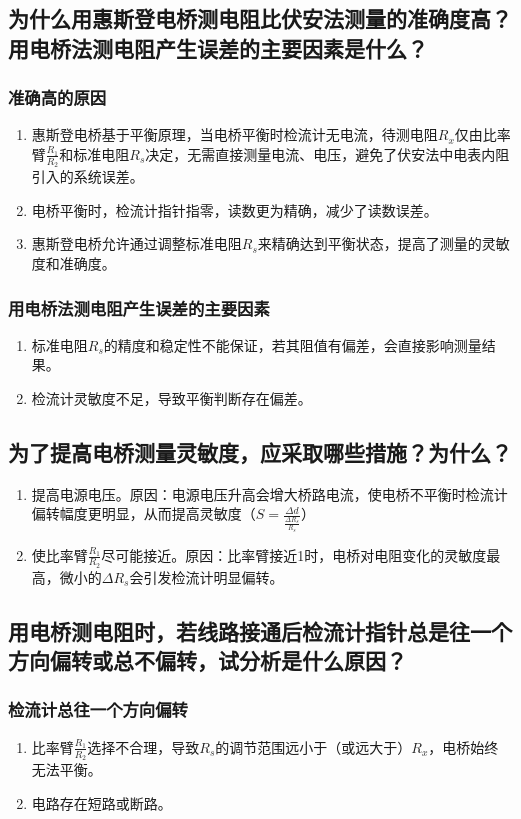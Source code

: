 \documentclass[]{../template/Report}%
\begin{document}
\begin{fullreportonly}
\subsection{为什么用惠斯登电桥测电阻比伏安法测量的准确度高？用电桥法测电阻产生误差的主要因素是什么？}

\subsubsection{准确高的原因}
\begin{enumerate}
   \item 惠斯登电桥基于平衡原理，当电桥平衡时检流计无电流，待测电阻\(R_x\)仅由比率臂\(\frac{R_1}{R_2}\)和标准电阻\(R_s\)决定，无需直接测量电流、电压，避免了伏安法中电表内阻引入的系统误差。
   \item 电桥平衡时，检流计指针指零，读数更为精确，减少了读数误差。
   \item 惠斯登电桥允许通过调整标准电阻\(R_s\)来精确达到平衡状态，提高了测量的灵敏度和准确度。
\end{enumerate}
\subsubsection{用电桥法测电阻产生误差的主要因素}
\begin{enumerate}
   \item 标准电阻\(R_s\)的精度和稳定性不能保证，若其阻值有偏差，会直接影响测量结果。
   \item 检流计灵敏度不足，导致平衡判断存在偏差。
\end{enumerate}
\subsection{为了提高电桥测量灵敏度，应采取哪些措施？为什么？}
\begin{enumerate}
  \item 提高电源电压。原因：电源电压升高会增大桥路电流，使电桥不平衡时检流计偏转幅度更明显，从而提高灵敏度（\(S = \frac{\Delta d}{\frac{\Delta R_s}{R_s}}\)）
  \item 使比率臂\(\frac{R_1}{R_2}\)尽可能接近。原因：比率臂接近1时，电桥对电阻变化的灵敏度最高，微小的\(\Delta R_s\)会引发检流计明显偏转。
\end{enumerate}
\subsection{用电桥测电阻时，若线路接通后检流计指针总是往一个方向偏转或总不偏转，试分析是什么原因？}
\subsubsection{检流计总往一个方向偏转}
\begin{enumerate}
   \item 比率臂\(\frac{R_1}{R_2}\)选择不合理，导致\(R_s\)的调节范围远小于（或远大于）\(R_x\)，电桥始终无法平衡。
   \item 电路存在短路或断路。
\end{enumerate}

\end{fullreportonly}
\end{document}
